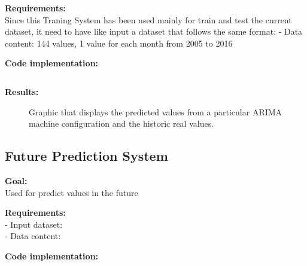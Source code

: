 \textbf{Requirements:}\\
Since this Traning System has been used mainly for train and test the current dataset, it need to have like input a dataset that follows the same format:
- Data content: 144 values, 1 value for each month from 2005 to 2016

\textbf{Code implementation:}\\
\begin{lstlisting}

\end{lstlisting}

\textbf{Results:}\\

\begin{figure}[H]
	\centering
    \caption{Graphic that displays the predicted values from a particular ARIMA machine configuration and the historic real values.}
\end{figure}


\newpage
\subsection{Future Prediction System}
\textbf{Goal:}\\ Used for predict values in the future

\textbf{Requirements:}\\
- Input dataset:\\
- Data content:

\textbf{Code implementation:}\\
\begin{lstlisting}

\end{lstlisting}

